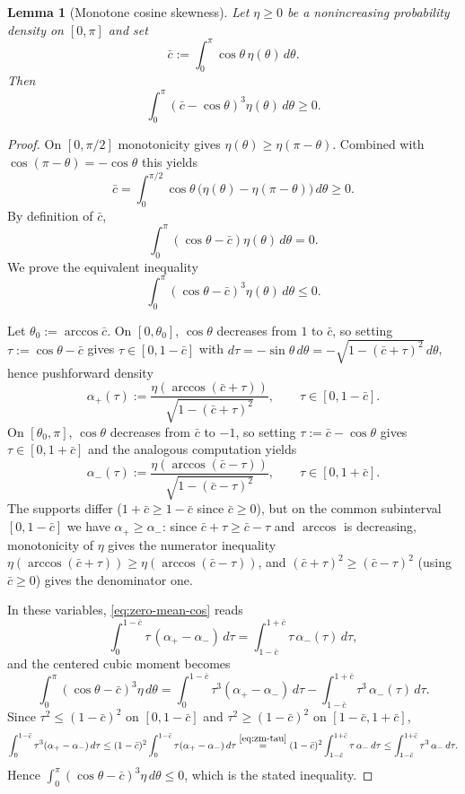 \documentclass{amsart}
\newtheorem{lemma}[theorem]{Lemma}
\begin{document}
\begin{lemma}[Monotone cosine skewness]\label{lem:monotone-cosine-skewness}
Let $\eta\geq0$ be a nonincreasing probability density on $[0,\pi]$ and set
\[
\bar c:=\int_0^\pi \cos\theta\,\eta(\theta)\,d\theta .
\]
Then
\[
\int_0^\pi(\bar c-\cos\theta)^3\eta(\theta)\,d\theta\geq 0.
\]
\end{lemma}
\begin{proof}
On $[0,\pi/2]$ monotonicity gives $\eta(\theta)\geq\eta(\pi-\theta)$. Combined with $\cos(\pi-\theta)=-\cos\theta$ this yields
\[
\bar c=\int_0^{\pi/2}\cos\theta\,\bigl(\eta(\theta)-\eta(\pi-\theta)\bigr)\,d\theta\geq 0.
\]
By definition of $\bar c$,
\begin{equation}\label{eq:zero-mean-cos}
\int_0^\pi(\cos\theta-\bar c)\eta(\theta)\,d\theta=0.
\end{equation}
We prove the equivalent inequality
\[
\int_0^\pi(\cos\theta-\bar c)^3\eta(\theta)\,d\theta\leq 0.
\]

Let $\theta_0:=\arccos\bar c$. On $[0,\theta_0]$, $\cos\theta$ decreases
from $1$ to $\bar c$, so setting $\tau:=\cos\theta-\bar c$ gives
$\tau\in[0,1-\bar c]$ with
$d\tau=-\sin\theta\,d\theta=-\sqrt{1-(\bar c+\tau)^2}\,d\theta$, hence
pushforward density
\[
\alpha_+(\tau):=\frac{\eta(\arccos(\bar c+\tau))}{\sqrt{1-(\bar c+\tau)^2}},\qquad\tau\in[0,1-\bar c].
\]
On $[\theta_0,\pi]$, $\cos\theta$ decreases from $\bar c$ to $-1$, so
setting $\tau:=\bar c-\cos\theta$ gives $\tau\in[0,1+\bar c]$ and the
analogous computation yields
\[
\alpha_-(\tau):=\frac{\eta(\arccos(\bar c-\tau))}{\sqrt{1-(\bar c-\tau)^2}},\qquad\tau\in[0,1+\bar c].
\]
The supports differ ($1+\bar c\geq 1-\bar c$ since $\bar c\geq 0$), but
on the common subinterval $[0,1-\bar c]$ we have $\alpha_+\geq\alpha_-$:
since $\bar c+\tau\geq\bar c-\tau$ and $\arccos$ is decreasing,
monotonicity of $\eta$ gives the numerator inequality
$\eta(\arccos(\bar c+\tau))\geq\eta(\arccos(\bar c-\tau))$, and
$(\bar c+\tau)^2\geq(\bar c-\tau)^2$ (using $\bar c\geq 0$) gives the
denominator one.

In these variables, \eqref{eq:zero-mean-cos} reads
\begin{equation}\label{eq:zm-tau}
\int_0^{1-\bar c}\tau\,(\alpha_+-\alpha_-)\,d\tau
=\int_{1-\bar c}^{1+\bar c}\tau\,\alpha_-(\tau)\,d\tau ,
\end{equation}
and the centered cubic moment becomes
\[
\int_0^\pi(\cos\theta-\bar c)^3\eta\,d\theta
=\int_0^{1-\bar c}\tau^3(\alpha_+-\alpha_-)\,d\tau
-\int_{1-\bar c}^{1+\bar c}\tau^3\,\alpha_-(\tau)\,d\tau .
\]
Since $\tau^2\leq(1-\bar c)^2$ on $[0,1-\bar c]$ and
$\tau^2\geq(1-\bar c)^2$ on $[1-\bar c,1+\bar c]$,
\[
\int_0^{1-\bar c}\tau^3(\alpha_+-\alpha_-)\,d\tau
\leq (1-\bar c)^2\int_0^{1-\bar c}\tau(\alpha_+-\alpha_-)\,d\tau
\stackrel{\eqref{eq:zm-tau}}{=}(1-\bar c)^2\int_{1-\bar c}^{1+\bar c}\tau\,\alpha_-\,d\tau
\leq \int_{1-\bar c}^{1+\bar c}\tau^3\,\alpha_-\,d\tau .
\]
Hence $\int_0^\pi(\cos\theta-\bar c)^3\eta\,d\theta\leq 0$, which is
the stated inequality.
\end{proof}
\end{document}
